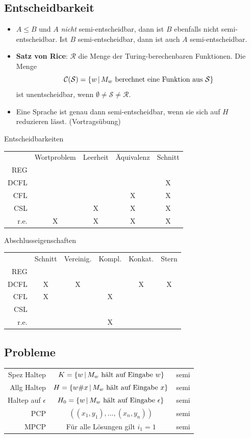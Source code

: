 \documentclass[landscape, 8pt, a4paper]{extarticle}
\newcommand{\set}[2]{\ensuremath\left\{ #1 \,\middle|\, #2 \right\}}
\begin{document}
\begin{multicols}{3}
	\section{Entscheidbarkeit}
	\begin{itemize}
		\item $A\leq B$ und $A$ \textit{nicht} semi-entscheidbar, dann ist $B$ ebenfalls nicht semi-entscheidbar.
		Ist $B$ semi-entscheidbar, dann ist auch $A$ semi-entscheidbar.
		\item \textbf{Satz von Rice}: $\mathcal R$ die Menge der Turing-berechenbaren Funktionen. Die Menge
		\begin{equation*}
			\mathcal C(\mathcal S)=\set{w}{M_w\text{ berechnet eine Funktion aus } \mathcal S}
		\end{equation*}
		ist unentscheidbar, wenn $\emptyset\neq\mathcal S\neq\mathcal R$.
		\item Eine Sprache ist genau dann semi-entscheidbar, wenn sie sich auf $H$ reduzieren lässt. (Vortragsübung)
	\end{itemize}
	Entscheidbarkeiten

	\begin{tabular}{r|cccc}
		&Wortproblem&Leerheit&Äquivalenz&Schnitt\\
		REG&\checkmark&\checkmark&\checkmark&\checkmark\\
		DCFL&\checkmark&\checkmark&\checkmark&X\\
		CFL&\checkmark&\checkmark&X&X\\
		CSL&\checkmark&X&X&X\\
		r.e.&X&X&X&X
	\end{tabular}

	Abschlusseigenschaften

	\begin{tabular}{r|ccccc}
		&Schnitt&Vereinig.&Kompl.&Konkat.&Stern\\
		REG&\checkmark&\checkmark&\checkmark&\checkmark&\checkmark\\
		DCFL&X&X&\checkmark&X&X\\
		CFL&X&\checkmark&X&\checkmark&\checkmark\\
		CSL&\checkmark&\checkmark&\checkmark&\checkmark&\checkmark\\
		r.e.&\checkmark&\checkmark&X&\checkmark&\checkmark
	\end{tabular}

	\subsection{Probleme}
	\begin{tabular}{r|c|l}
		Spez Haltep & $K=\set{w}{M_w \text{ hält auf Eingabe } w}$ & semi\\
		Allg Haltep & $H=\set{w\# x}{M_w \text{ hält auf Eingabe } x}$ & semi\\
		Haltep auf $\epsilon$ & $H_0=\set{w}{M_w \text{ hält auf Eingabe } \epsilon}$ & semi\\
		PCP & $((x_1,y_1),\ldots,(x_n,y_n))$ & semi\\
		MPCP & Für alle Lösungen gilt $i_1=1$ & semi
	\end{tabular}


\end{multicols}
\end{document}

